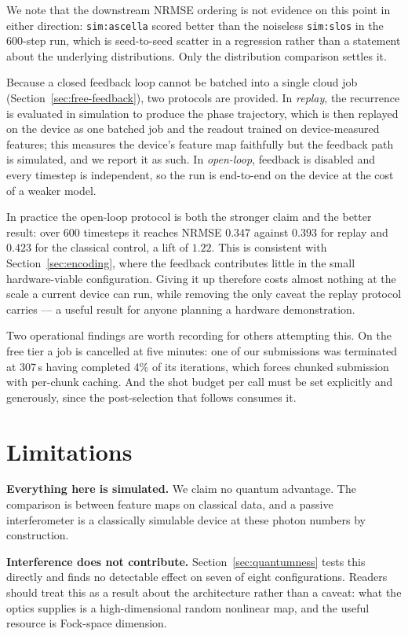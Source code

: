 \documentclass[11pt]{article}
\begin{document}
We note that the downstream NRMSE ordering is not evidence on this point in either direction:
\texttt{sim:ascella} scored better than the noiseless \texttt{sim:slos} in the 600-step run,
which is seed-to-seed scatter in a regression rather than a statement about the underlying
distributions. Only the distribution comparison settles it.

Because a closed feedback loop cannot be batched into a single cloud job
(Section~\ref{sec:free-feedback}), two protocols are provided. In \emph{replay}, the recurrence
is evaluated in simulation to produce the phase trajectory, which is then replayed on the
device as one batched job and the readout trained on device-measured features; this measures
the device's feature map faithfully but the feedback path is simulated, and we report it
as such. In \emph{open-loop}, feedback is disabled and every timestep is independent, so the run
is end-to-end on the device at the cost of a weaker model.

In practice the open-loop protocol is both the stronger claim and the better result: over 600
timesteps it reaches NRMSE $0.347$ against $0.393$ for replay and $0.423$ for the classical
control, a lift of $1.22$. This is consistent with Section~\ref{sec:encoding}, where the
feedback contributes little in the small hardware-viable configuration. Giving it up therefore
costs almost nothing at the scale a current device can run, while removing the only caveat the
replay protocol carries --- a useful result for anyone planning a hardware demonstration.

Two operational findings are worth recording for others attempting this. On the free tier a
job is cancelled at five minutes: one of our submissions was terminated at 307\,s having
completed 4\% of its iterations, which forces chunked submission with per-chunk caching. And
the shot budget per call must be set explicitly and generously, since the post-selection that
follows consumes it.

\section{Limitations}\label{sec:limitations}

\textbf{Everything here is simulated.} We claim no quantum advantage. The comparison is between
feature maps on classical data, and a passive interferometer is a classically simulable device
at these photon numbers by construction.

\textbf{Interference does not contribute.} Section~\ref{sec:quantumness} tests this directly
and finds no detectable effect on seven of eight configurations. Readers should treat this as a
result about the architecture rather than a caveat: what the optics supplies is a
high-dimensional random nonlinear map, and the useful resource is Fock-space dimension.
\end{document}
